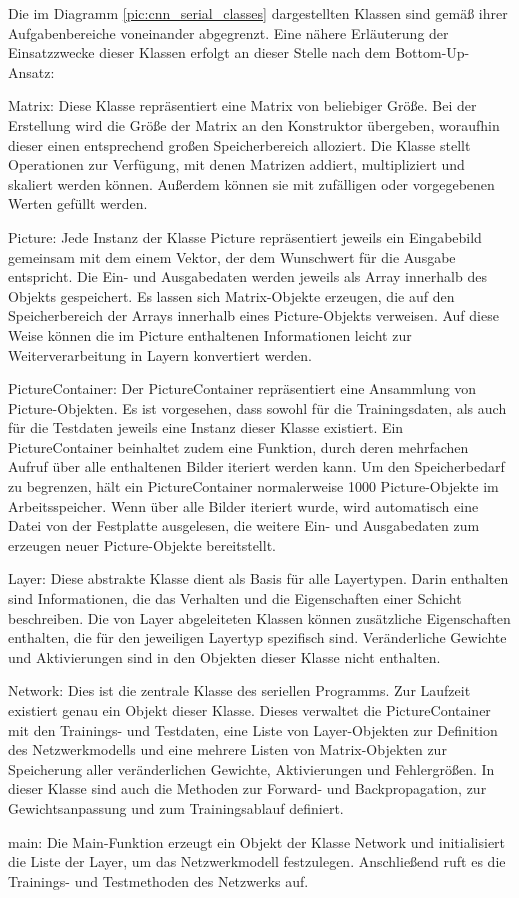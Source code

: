 \documentclass[../main.tex]{subfiles}
\begin{document}
Die im Diagramm \ref{pic:cnn_serial_classes} dargestellten Klassen sind gemäß ihrer Aufgabenbereiche voneinander abgegrenzt. Eine nähere Erläuterung der Einsatzzwecke dieser Klassen erfolgt an dieser Stelle nach dem Bottom-Up-Ansatz: 
\begin{description}
\item{Matrix:} Diese Klasse repräsentiert eine Matrix von beliebiger Größe. Bei der Erstellung wird die Größe der Matrix an den Konstruktor übergeben, woraufhin dieser einen entsprechend großen Speicherbereich alloziert. Die Klasse stellt Operationen zur Verfügung, mit denen Matrizen addiert, multipliziert und skaliert werden können. Außerdem können sie mit zufälligen oder vorgegebenen Werten gefüllt werden. 
\item{Picture:} Jede Instanz der Klasse Picture repräsentiert jeweils ein Eingabebild gemeinsam mit dem einem Vektor, der dem Wunschwert für die Ausgabe entspricht. Die Ein- und Ausgabedaten werden jeweils als Array innerhalb des Objekts gespeichert. Es lassen sich Matrix-Objekte erzeugen, die auf den Speicherbereich der Arrays innerhalb eines Picture-Objekts verweisen. Auf diese Weise können die im Picture enthaltenen Informationen leicht zur Weiterverarbeitung in Layern konvertiert werden. 
\item{PictureContainer:} Der PictureContainer repräsentiert eine Ansammlung von Picture-Objekten. Es ist vorgesehen, dass sowohl für die Trainingsdaten, als auch für die Testdaten jeweils eine Instanz dieser Klasse existiert. Ein PictureContainer beinhaltet zudem eine Funktion, durch deren mehrfachen Aufruf über alle enthaltenen Bilder iteriert werden kann. Um den Speicherbedarf zu begrenzen, hält ein PictureContainer normalerweise 1000 Picture-Objekte im Arbeitsspeicher. Wenn über alle Bilder iteriert wurde, wird automatisch eine Datei von der Festplatte ausgelesen, die weitere Ein- und Ausgabedaten zum erzeugen neuer Picture-Objekte  bereitstellt. 
\item{Layer:} Diese abstrakte Klasse dient als Basis für alle Layertypen. Darin enthalten sind Informationen, die das Verhalten und die Eigenschaften einer Schicht beschreiben. Die von Layer abgeleiteten Klassen können zusätzliche Eigenschaften enthalten, die für den jeweiligen Layertyp spezifisch sind. Veränderliche Gewichte und Aktivierungen sind in den Objekten dieser Klasse nicht enthalten. 
\item{Network:} Dies ist die zentrale Klasse des seriellen Programms. Zur Laufzeit existiert genau ein Objekt dieser Klasse. Dieses verwaltet die PictureContainer mit den Trainings- und Testdaten, eine Liste von Layer-Objekten zur Definition des Netzwerkmodells und eine mehrere Listen von Matrix-Objekten zur Speicherung aller veränderlichen Gewichte, Aktivierungen und Fehlergrößen. In dieser Klasse sind auch die Methoden zur Forward- und Backpropagation, zur Gewichtsanpassung und zum Trainingsablauf definiert. 
\item{main:} Die Main-Funktion erzeugt ein Objekt der Klasse Network und initialisiert die Liste der Layer, um das Netzwerkmodell festzulegen. Anschließend ruft es die Trainings- und Testmethoden des Netzwerks auf. 
\end{description}
\end{document}
